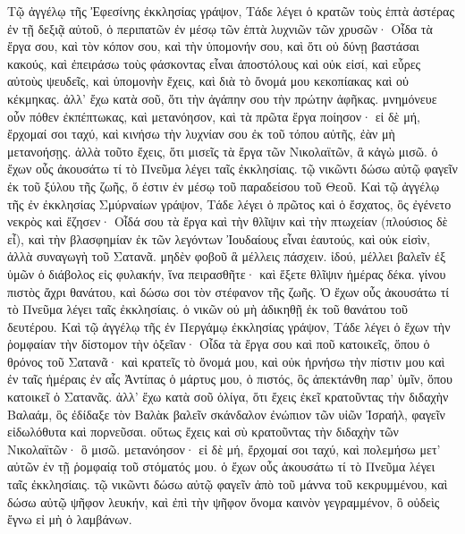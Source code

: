 \begin{pages}
    \begin{Leftside}
        \beginnumbering
			Τῷ ἀγγέλῳ τῆς Ἐφεσίνης ἐκκλησίας γράψον, Τάδε λέγει ὁ κρατῶν τοὺς ἑπτὰ ἀστέρας ἐν τῇ δεξιᾷ αὐτοῦ, ὁ περιπατῶν ἐν μέσῳ τῶν ἑπτὰ λυχνιῶν τῶν χρυσῶν· Οἶδα τὰ ἔργα σου, καὶ τὸν κόπον σου, καὶ τὴν ὑπομονήν σου, καὶ ὅτι οὐ δύνῃ βαστάσαι κακούς, καὶ ἐπειράσω τοὺς φάσκοντας εἶναι ἀποστόλους καὶ οὐκ εἰσί, καὶ εὗρες αὐτοὺς ψευδεῖς, καὶ ὑπομονὴν ἔχεις, καὶ διὰ τὸ ὄνομά μου κεκοπίακας καὶ οὐ κέκμηκας.
		\pend 
		\pstart
			ἀλλ’ ἔχω κατὰ σοῦ, ὅτι τὴν ἀγάπην σου τὴν πρώτην ἀφῆκας. μνημόνευε οὖν πόθεν ἐκπέπτωκας, καὶ μετανόησον, καὶ τὰ πρῶτα ἔργα ποίησον· εἰ δὲ μή, ἔρχομαί σοι ταχύ, καὶ κινήσω τὴν λυχνίαν σου ἐκ τοῦ τόπου αὐτῆς, ἐὰν μὴ μετανοήσῃς. 
		\pend
		\pstart
			ἀλλὰ τοῦτο ἔχεις, ὅτι μισεῖς τὰ ἔργα τῶν Νικολαϊτῶν, ἃ κἀγὼ μισῶ. ὁ ἔχων οὖς ἀκουσάτω τί τὸ Πνεῦμα λέγει ταῖς ἐκκλησίαις. τῷ νικῶντι δώσω αὐτῷ φαγεῖν ἐκ τοῦ ξύλου τῆς ζωῆς, ὅ ἐστιν ἐν μέσῳ τοῦ παραδείσου τοῦ Θεοῦ.
		\pend
		\pstart
			Καὶ τῷ ἀγγέλῳ τῆς ἐν ἐκκλησίας Σμύρναίων γράψον, Τάδε λέγει ὁ πρῶτος καὶ ὁ ἔσχατος, ὃς ἐγένετο νεκρὸς καὶ ἔζησεν· Οἶδά σου τὰ ἔργα καὶ τὴν θλῖψιν καὶ τὴν πτωχείαν (πλούσιος δὲ εἶ), καὶ τὴν βλασφημίαν ἐκ τῶν λεγόντων Ἰουδαίους εἶναι ἑαυτούς, καὶ οὐκ εἰσὶν, ἀλλὰ συναγωγὴ τοῦ Σατανᾶ. μηδὲν φοβοῦ ἃ μέλλεις πάσχειν. ἰδού, μέλλει βαλεῖν ἐξ ὑμῶν ὁ διάβολος εἰς φυλακήν, ἵνα πειρασθῆτε· καὶ ἕξετε θλῖψιν ἡμέρας δέκα. γίνου πιστὸς ἄχρι θανάτου, καὶ δώσω σοι τὸν στέφανον τῆς ζωῆς. Ὁ ἔχων οὖς ἀκουσάτω τί τὸ Πνεῦμα λέγει ταῖς ἐκκλησίαις. ὁ νικῶν οὐ μὴ ἀδικηθῇ ἐκ τοῦ θανάτου τοῦ δευτέρου.
		\pend
		\pstart
			Καὶ τῷ ἀγγέλῳ τῆς ἐν Περγάμῳ ἐκκλησίας γράψον, Tάδε λέγει ὁ ἔχων τὴν ῥομφαίαν τὴν δίστομον τὴν ὀξεῖαν· Οἶδα τὰ ἔργα σου καὶ ποῦ κατοικεῖς, ὅπου ὁ θρόνος τοῦ Σατανᾶ· καὶ κρατεῖς τὸ ὄνομά μου, καὶ οὐκ ἠρνήσω τὴν πίστιν μου καὶ ἐν ταῖς ἡμέραις ἐν αἷς Ἀντίπας ὁ μάρτυς μου, ὁ πιστός, ὃς ἀπεκτάνθη παρ’ ὑμῖν, ὅπου κατοικεῖ ὁ Σατανᾶς.
		\pend
		\pstart	
			ἀλλ’ ἔχω κατὰ σοῦ ὀλίγα, ὅτι ἔχεις ἐκεῖ κρατοῦντας τὴν διδαχὴν Βαλαάμ, ὃς ἐδίδαξε τὸν Βαλὰκ βαλεῖν σκάνδαλον ἐνώπιον τῶν υἱῶν Ἰσραήλ, φαγεῖν εἰδωλόθυτα καὶ πορνεῦσαι. οὕτως ἔχεις καὶ σὺ κρατοῦντας τὴν διδαχὴν τῶν Νικολαϊτῶν· ὃ μισῶ. μετανόησον· εἰ δὲ μή, ἔρχομαί σοι ταχύ, καὶ πολεμήσω μετ’ αὐτῶν ἐν τῇ ῥομφαίᾳ τοῦ στόματός μου. ὁ ἔχων οὖς ἀκουσάτω τί τὸ Πνεῦμα λέγει ταῖς ἐκκλησίαις. τῷ νικῶντι δώσω αὐτῷ φαγεῖν ἀπὸ τοῦ μάννα τοῦ κεκρυμμένου, καὶ δώσω αὐτῷ ψῆφον λευκήν, καὶ ἐπὶ τὴν ψῆφον ὄνομα καινὸν γεγραμμένον, ὃ οὐδεὶς ἔγνω εἰ μὴ ὁ λαμβάνων.

\end{Leftside}
\end{pages}
